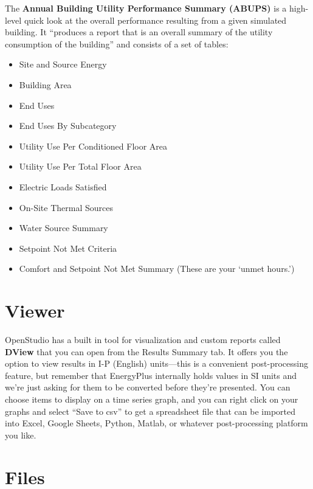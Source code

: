 \documentclass[10pt]{article}
\begin{document}
The \textbf{Annual Building Utility Performance Summary (ABUPS)} is a high-level quick look at the overall performance resulting from a given simulated building. It ``produces a report that is an overall summary of the utility consumption
of the building'' and consists of a set of tables: \cite{EPdocs9inputoutput}

\vspace{-2pt}
\begin{itemize}
    \setlength{\itemsep}{0pt}%
    \setlength{\parskip}{0pt}%
    \item Site and Source Energy
    \item Building Area
    \item End Uses
    \item End Uses By Subcategory
    \item Utility Use Per Conditioned Floor Area
    \item Utility Use Per Total Floor Area
    \item Electric Loads Satisfied
    \item On-Site Thermal Sources
    \item Water Source Summary
    \item Setpoint Not Met Criteria
    \item Comfort and Setpoint Not Met Summary (These are your `unmet hours.')
\end{itemize}
\vspace{-4pt}


\section{Viewer}

OpenStudio has a built in tool for visualization and custom reports called \textbf{DView} that you can open from the Results Summary tab. It offers you the option to view results in I-P (English) units---this is a convenient post-processing feature, but remember that EnergyPlus internally holds values in SI units and we're just asking for them to be converted before they're presented. You can choose items to display on a time series graph, and you can right click on your graphs and select ``Save to csv'' to get a spreadsheet file that can be imported into  Excel, Google Sheets, Python, Matlab, or whatever post-processing platform you like.

\section{Files}
\label{files}
\end{document}

